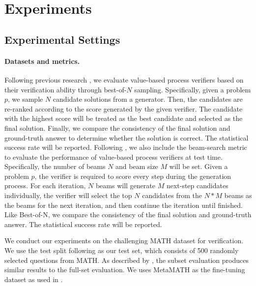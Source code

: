 \section{Experiments}
\subsection{Experimental Settings}
\paragraph{Datasets and metrics.} Following previous research \citep{DBLP:conf/acl/WangLSXDLCWS24,DBLP:conf/iclr/LightmanKBEBLLS24}, we evaluate value-based process verifiers based on their verification ability through best-of-$N$ sampling. Specifically, given a problem $p$, we sample $N$ candidate solutions from a generator. Then, the candidates are re-ranked according to the score generated by the given verifier. The candidate with the highest score will be treated as the best candidate and selected as the final solution. Finally, we compare the consistency of the final solution and ground-truth answer to determine whether the solution is correct. The statistical success rate will be reported. Following \citet{DBLP:journals/corr/abs-2408-03314}, we also include the beam-search metric to evaluate the performance of value-based process verifiers at test time. Specifically, the number of beams $N$ and beam size $M$ will be set. Given a problem $p$, the verifier is required to score every step during the generation process. For each iteration, $N$ beams will generate $M$ next-step candidates individually, the verifier will select the top $N$ candidates from the $N*M$ beams as the beams for the next iteration, and then continue the iteration until finished. Like Best-of-N, we compare the consistency of the final solution and ground-truth answer. The statistical success rate will be reported.

We conduct our experiments on the challenging MATH dataset\citet{DBLP:conf/nips/HendrycksBKABTS21} for verification. We use the test split following \citet{DBLP:conf/iclr/LightmanKBEBLLS24} as our test set, which consists of 500 randomly selected questions from MATH. As described by \citet{DBLP:conf/acl/WangLSXDLCWS24}, the subset evaluation produces similar results to the full-set evaluation. We uses MetaMATH\citep{DBLP:conf/iclr/YuJSYLZKLWL24} as the fine-tuning dataset as used in \citet{DBLP:conf/acl/WangLSXDLCWS24}.

